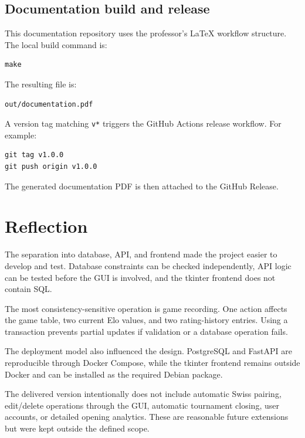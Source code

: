 \documentclass[11pt,a4paper]{article}
\begin{document}
\subsection{Documentation build and release}

This documentation repository uses the professor's LaTeX workflow structure.
The local build command is:

\begin{verbatim}
make
\end{verbatim}

The resulting file is:

\begin{verbatim}
out/documentation.pdf
\end{verbatim}

A version tag matching \texttt{v*} triggers the GitHub Actions release
workflow. For example:

\begin{verbatim}
git tag v1.0.0
git push origin v1.0.0
\end{verbatim}

The generated documentation PDF is then attached to the GitHub Release.

\section{Reflection}

The separation into database, API, and frontend made the project easier to
develop and test. Database constraints can be checked independently, API logic
can be tested before the GUI is involved, and the tkinter frontend does not
contain SQL.

The most consistency-sensitive operation is game recording. One action affects
the game table, two current Elo values, and two rating-history entries. Using a
transaction prevents partial updates if validation or a database operation
fails.

The deployment model also influenced the design. PostgreSQL and FastAPI are
reproducible through Docker Compose, while the tkinter frontend remains outside
Docker and can be installed as the required Debian package.

The delivered version intentionally does not include automatic Swiss pairing,
edit/delete operations through the GUI, automatic tournament closing, user
accounts, or detailed opening analytics. These are reasonable future
extensions but were kept outside the defined scope.
\end{document}
